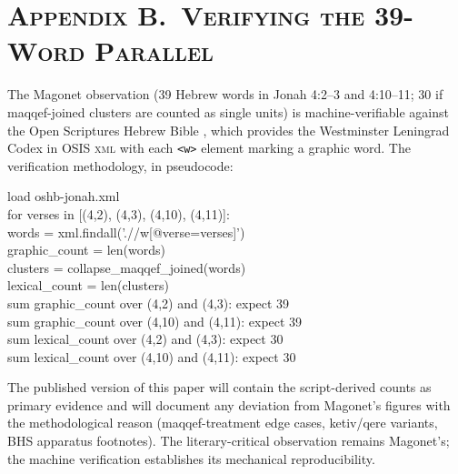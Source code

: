 \documentclass[11pt]{article}
\theoremstyle{rukha}
\newcommand{\sceq}[1]{\textsc{#1}}
\begin{document}
\vspace{1em}

\section*{\sceq{Appendix B.\ Verifying the 39-Word Parallel}}

The Magonet observation (39 Hebrew words in Jonah 4:2--3 and 4:10--11;
30 if maqqef-joined clusters are counted as single units) is
machine-verifiable against the Open Scriptures Hebrew Bible
\cite{oshb}, which provides the Westminster Leningrad Codex in OSIS
\textsc{xml} with each \texttt{<w>} element marking a graphic word. The
verification methodology, in pseudocode:

\begin{small}\ttfamily{}
\noindent
load oshb-jonah.xml\\
for verses in [(4,2), (4,3), (4,10), (4,11)]:\\
\hspace*{2em}words = xml.findall('.//w[@verse=verses]')\\
\hspace*{2em}graphic\_count = len(words)\\
\hspace*{2em}clusters = collapse\_maqqef\_joined(words)\\
\hspace*{2em}lexical\_count = len(clusters)\\
sum graphic\_count over (4,2) and (4,3): expect 39\\
sum graphic\_count over (4,10) and (4,11): expect 39\\
sum lexical\_count over (4,2) and (4,3): expect 30\\
sum lexical\_count over (4,10) and (4,11): expect 30
\end{small}

\vspace{0.6em}

\noindent
The published version of this paper will contain the script-derived
counts as primary evidence and will document any deviation from
Magonet's figures with the methodological reason
(maqqef-treatment edge cases, ketiv/qere variants, BHS apparatus
footnotes). The literary-critical observation remains Magonet's; the
machine verification establishes its mechanical reproducibility.

\vspace{1.4em}
\end{document}
